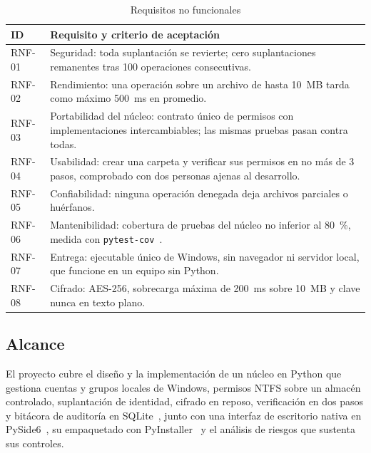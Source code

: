\documentclass[conference]{IEEEtran}
\begin{document}
\begin{table}[!htb]
\caption{Requisitos no funcionales}
\label{tab:rnf}
\centering
\footnotesize
\begin{tabular}{|l|p{7.0cm}|}
\hline
\textbf{ID} & \textbf{Requisito y criterio de aceptación} \\
\hline
RNF-01 & Seguridad: toda suplantación se revierte; cero suplantaciones remanentes tras 100 operaciones consecutivas. \\
\hline
RNF-02 & Rendimiento: una operación sobre un archivo de hasta 10~MB tarda como máximo 500~ms en promedio. \\
\hline
RNF-03 & Portabilidad del núcleo: contrato único de permisos con implementaciones intercambiables; las mismas pruebas pasan contra todas. \\
\hline
RNF-04 & Usabilidad: crear una carpeta y verificar sus permisos en no más de 3 pasos, comprobado con dos personas ajenas al desarrollo. \\
\hline
RNF-05 & Confiabilidad: ninguna operación denegada deja archivos parciales o huérfanos. \\
\hline
RNF-06 & Mantenibilidad: cobertura de pruebas del núcleo no inferior al 80~\%, medida con \texttt{pytest-cov}~\cite{pytestcov}. \\
\hline
RNF-07 & Entrega: ejecutable único de Windows, sin navegador ni servidor local, que funcione en un equipo sin Python. \\
\hline
RNF-08 & Cifrado: AES-256, sobrecarga máxima de 200~ms sobre 10~MB y clave nunca en texto plano. \\
\hline
\end{tabular}
\end{table}

\subsection{Alcance}
\label{sec:alcance}
El proyecto cubre el diseño y la implementación de un núcleo en Python que gestiona cuentas y grupos locales de Windows, permisos NTFS sobre un almacén controlado, suplantación de identidad, cifrado en reposo, verificación en dos pasos y bitácora de auditoría en SQLite~\cite{sqlite}, junto con una interfaz de escritorio nativa en PySide6~\cite{pyside}, su empaquetado con PyInstaller~\cite{pyinstaller} y el análisis de riesgos que sustenta sus controles.
\end{document}

